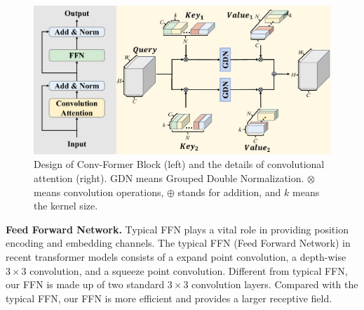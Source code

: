 \documentclass[letterpaper]{article} %
\begin{document}
\begin{figure}
  \begin{center}
     \includegraphics[width=\linewidth]{image/figure4_ConvFormerBlock.pdf}
  \end{center}
     \caption{Design of Conv-Former Block (left) and the details of convolutional attention (right). GDN means Grouped Double Normalization. $\otimes$ means convolution operations, $\oplus$ stands for addition, and $k$ means the kernel size.}
  \label{fig:figure4_ConvFormerBlock}
  \end{figure}

\noindent
{\bf Feed Forward Network.}
Typical FFN plays a vital role in providing position encoding and embedding channels. The typical FFN (Feed Forward Network) in recent transformer models consists of a expand point convolution, a depth-wise $3 \times 3$ convolution, and a squeeze point convolution. Different from typical FFN, our FFN is made up of two standard $3 \times 3$ convolution layers. Compared with the typical FFN, our FFN is more efficient and provides a larger receptive field.
\end{document}
